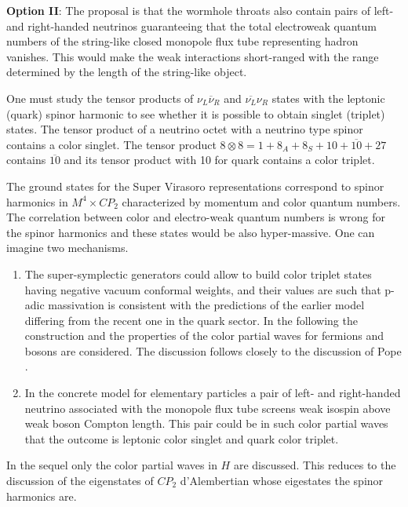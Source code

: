 \documentclass[10pt,epsf]{article}
\begin{document}
\begin{enumerate}
{\bf Option II}: The proposal is that  the   wormhole throats also contain pairs of left- and right-handed neutrinos   guaranteeing that the total electroweak quantum numbers of the string-like closed monopole flux tube representing hadron vanishes. This would make the weak interactions short-ranged with  the range determined by the length of the string-like object.

One must study the tensor products of  $\nu_L\overline{\nu}_R$ and $\overline{\nu_L}\nu_R$ states with the leptonic (quark) spinor harmonic to see whether it is possible to obtain  singlet (triplet) states. The tensor product  of a neutrino octet with a neutrino type spinor contains a color singlet. The tensor product $8\otimes 8 = 1+8_A+8_S+10+\overline{10}+27$ contains $\overline{10}$  and its tensor product with 10 for quark contains a color triplet.

\end{enumerate}



The ground states for  the Super Virasoro representations correspond to spinor harmonics in $M^4 \times CP_2$ characterized by momentum and  color quantum numbers. The correlation between color and  electro-weak quantum numbers is   wrong for the spinor harmonics and these states would be also  hyper-massive. One can imagine two mechanisms.

\begin{enumerate} 

\item The super-symplectic generators could allow to build  color triplet states having negative vacuum  conformal weights, and their values are  such that p-adic massivation is consistent with the predictions of the earlier model differing from the recent one in the quark sector. In the following the construction and the properties of the  color partial waves for fermions and bosons are considered. The discussion follows closely to the discussion of   \cite{bmat}{Pope} .

\item In the concrete model for elementary particles a pair of left- and right-handed neutrino associated with the monopole flux tube screens weak isospin above weak boson Compton length. This pair could be in such color partial waves that  the outcome is leptonic color singlet  and quark color triplet.

\end{enumerate}

In the sequel only the color partial waves in $H$ are discussed. This reduces to the discussion of the eigenstates of $CP_2$ d'Alembertian whose eigestates the spinor harmonics are.
\end{document}

